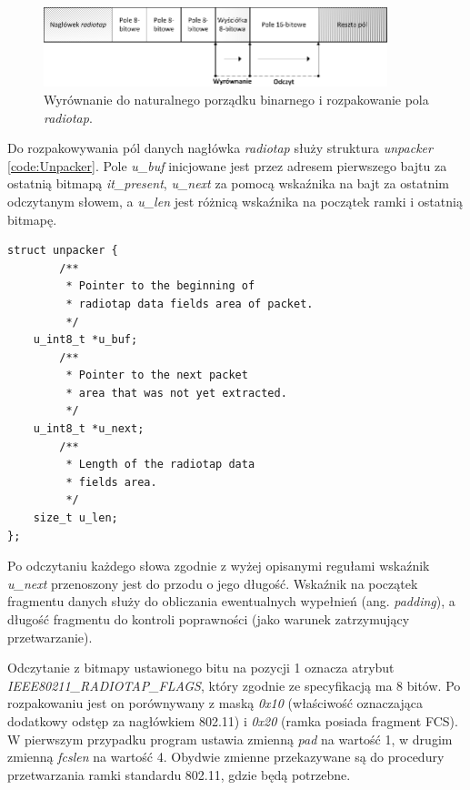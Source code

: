 \begin{figure}[htb]
\begin{center}
\includegraphics[width=378px]{img/RadiotapUnpack}
\caption{Wyrównanie do naturalnego porządku binarnego i rozpakowanie pola \emph{radiotap}.}
\label{RadiotapUnpack}
\end{center}
\end{figure}

Do rozpakowywania pól danych nagłówka \emph{radiotap} służy struktura \emph{unpacker} \ref{code:Unpacker}. Pole \emph{u\_buf} inicjowane jest przez adresem pierwszego bajtu za ostatnią bitmapą \emph{it\_present}, \emph{u\_next} za pomocą  wskaźnika na bajt za ostatnim odczytanym słowem, a \emph{u\_len} jest różnicą wskaźnika na początek ramki i ostatnią bitmapę. 

\begin{lstlisting}[frame=tb]
struct unpacker {
        /** 
         * Pointer to the beginning of 
         * radiotap data fields area of packet. 
         */
	u_int8_t *u_buf;
        /** 
         * Pointer to the next packet 
         * area that was not yet extracted. 
         */
	u_int8_t *u_next;
        /** 
         * Length of the radiotap data 
         * fields area. 
         */
	size_t u_len;
};
\end{lstlisting}

Po odczytaniu każdego słowa zgodnie z wyżej opisanymi regułami wskaźnik \emph{u\_next} przenoszony jest do przodu o jego długość. Wskaźnik na początek fragmentu danych służy do obliczania ewentualnych wypełnień (ang. \emph{padding}), a długość fragmentu do kontroli poprawności (jako warunek zatrzymujący przetwarzanie).

Odczytanie z bitmapy ustawionego bitu na pozycji 1 oznacza atrybut \emph{IEEE80211\_RADIOTAP\_FLAGS}, który zgodnie ze specyfikacją ma 8 bitów. Po rozpakowaniu jest on porównywany z maską \emph{0x10} (właściwość oznaczająca dodatkowy odstęp za nagłówkiem 802.11) i \emph{0x20} (ramka posiada fragment FCS). W pierwszym przypadku program ustawia zmienną \emph{pad} na wartość 1, w drugim zmienną \emph{fcslen} na wartość 4. Obydwie zmienne przekazywane są do procedury przetwarzania ramki standardu 802.11, gdzie będą potrzebne. 

